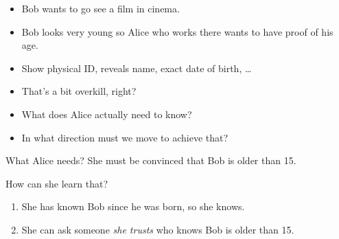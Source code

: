 \begin{frame}
  \begin{example}
    \begin{itemize}
      \item Bob wants to go see a film in cinema.
      \item Bob looks very young so Alice who works there wants to have proof 
        of his age.

        \pause{}

      \item Show physical ID, reveals name, exact date of birth, \dots
    \end{itemize}
  \end{example}

  \pause{}

  \begin{exercise}
    \begin{itemize}
      \item That's a bit overkill, right?
      \item What does Alice actually need to know?
      \item In what direction must we move to achieve that?
    \end{itemize}
  \end{exercise}
\end{frame}

\begin{frame}
  \begin{block}{What Alice needs?}
    She must be convinced that Bob is older than 15.
  \end{block}

  \pause{}

  \begin{alertblock}{How can she learn that?}
    \begin{enumerate}
      \item She has known Bob since he was born, so she knows.

        \pause{}

      \item She can ask someone \emph{she trusts} who knows Bob is older than 
        15.
    \end{enumerate}
  \end{alertblock}
\end{frame}


